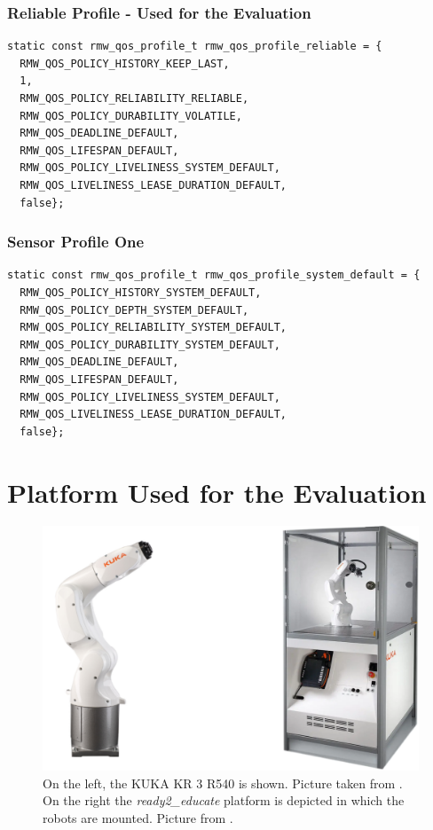 \subsubsection*{Reliable Profile - Used for the Evaluation}
\begin{lstlisting}[caption=Reliable profile.,label=ca_code_qos_reliable]
static const rmw_qos_profile_t rmw_qos_profile_reliable = {
  RMW_QOS_POLICY_HISTORY_KEEP_LAST,
  1,
  RMW_QOS_POLICY_RELIABILITY_RELIABLE,
  RMW_QOS_POLICY_DURABILITY_VOLATILE,
  RMW_QOS_DEADLINE_DEFAULT,
  RMW_QOS_LIFESPAN_DEFAULT,
  RMW_QOS_POLICY_LIVELINESS_SYSTEM_DEFAULT,
  RMW_QOS_LIVELINESS_LEASE_DURATION_DEFAULT,
  false};
\end{lstlisting}
\subsubsection*{Sensor Profile One}
\begin{lstlisting}[caption=System default profile.,label=ca_code_qos_system_default]
static const rmw_qos_profile_t rmw_qos_profile_system_default = {
  RMW_QOS_POLICY_HISTORY_SYSTEM_DEFAULT,
  RMW_QOS_POLICY_DEPTH_SYSTEM_DEFAULT,
  RMW_QOS_POLICY_RELIABILITY_SYSTEM_DEFAULT,
  RMW_QOS_POLICY_DURABILITY_SYSTEM_DEFAULT,
  RMW_QOS_DEADLINE_DEFAULT,
  RMW_QOS_LIFESPAN_DEFAULT,
  RMW_QOS_POLICY_LIVELINESS_SYSTEM_DEFAULT,
  RMW_QOS_LIVELINESS_LEASE_DURATION_DEFAULT,
  false};
\end{lstlisting}

\section{Platform Used for the Evaluation}
\begin{figure}[htbp]
	\centering
	\includegraphics[width=1\textwidth]{Figures/c3/robot_and_cell.pdf}
	\caption{On the left, the KUKA KR 3 R540 is shown. Picture taken from \cite{noauthor_kuka_kr_3_agiluspdf_nodate}. On the right the \textit{ready2\_educate} platform is depicted in which the robots are mounted. Picture from \cite{noauthor_ready2_educate_nodate}.}
	\label{ca_fig_r2c_mr_is}
\end{figure}
